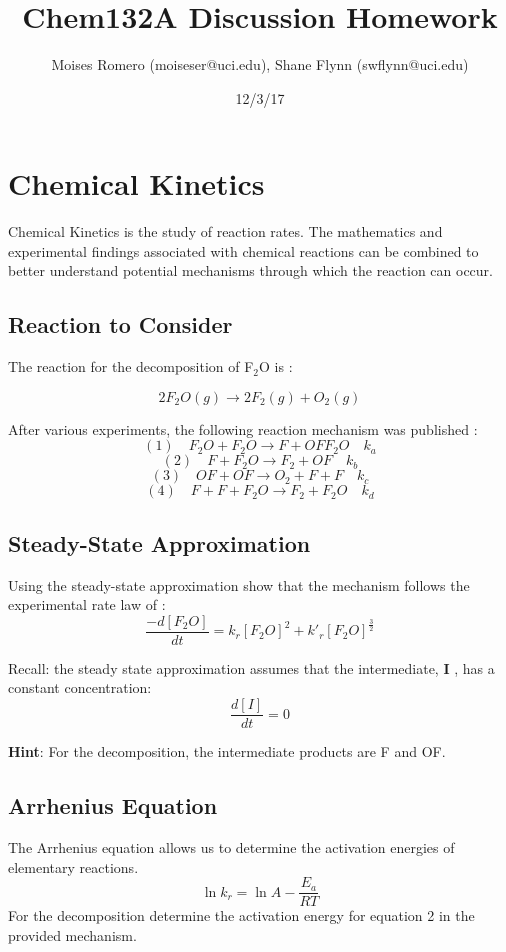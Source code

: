 \documentclass{article}
\title{Chem132A Discussion  Homework}
\author{Moises Romero (moiseser@uci.edu), Shane Flynn (swflynn@uci.edu) }
\date{12/3/17}
\newcommand{\be}{\begin{equation}}
\newcommand{\ee}{\end{equation}}
\newcommand{\ben}{\begin{equation*}}
\newcommand{\een}{\end{equation*}}
\begin{document}
\maketitle

\section{Chemical Kinetics}
Chemical Kinetics is the study of reaction rates.
The mathematics and experimental findings associated with chemical reactions can be combined to better understand potential mechanisms through which the reaction can occur. 

\subsection*{Reaction to Consider}
The reaction for the decomposition of F$_2$O is : 

\be
2F_2O(g) \rightarrow 2F_2(g) + O_2(g)
\ee

After various experiments, the following reaction mechanism was published : 
\ben
(1) \quad F_2O + F_2O \rightarrow  F + OF F_2O \quad k_a 
\een
\ben
(2) \quad F + F_2O \rightarrow F_2 + OF \quad k_b 
\een
\ben
(3) \quad OF + OF \rightarrow O_2 + F + F \quad k_c
\een
\ben
(4) \quad F + F + F_2O \rightarrow F_2 + F_2O \quad k_d
\een

\subsection{Steady-State Approximation}

Using the steady-state approximation show that the mechanism follows the experimental rate law of : 
\be
\frac{-d[F_2O]}{dt} = k_r[F_2O]^2 + k'_r[F_2O]^{\frac{3}{2}}
\ee

Recall: the steady state approximation assumes that the intermediate, \textbf{I} , has a constant concentration:
\be
\frac{d[I]}{dt} = 0 
\ee

\textbf{Hint}: For the decomposition, the intermediate products are F and OF. 

\subsection{Arrhenius Equation}
The Arrhenius equation allows us to determine the activation energies of elementary reactions. 
\be
\ln k_r = \ln A -\frac{E_a}{RT}
\ee
For the decomposition determine the activation energy for equation 2 in the provided mechanism. 
\end{document}
